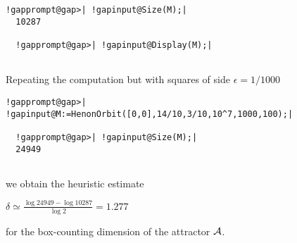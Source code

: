 \documentclass[a4paper,11pt]{report}
\begin{document}
{{\begin{Verbatim}[commandchars=!@|,fontsize=\small,frame=single,label=Example]
  !gapprompt@gap>| !gapinput@Size(M);|
  10287
  
  !gapprompt@gap>| !gapinput@Display(M);|
  
\end{Verbatim}
  

Repeating the computation but with squares of side $\epsilon =1/1000$ 
\begin{Verbatim}[commandchars=!@|,fontsize=\small,frame=single,label=Example]
  !gapprompt@gap>| !gapinput@M:=HenonOrbit([0,0],14/10,3/10,10^7,1000,100);|
  
  !gapprompt@gap>| !gapinput@Size(M);|
  24949
  
\end{Verbatim}
 

 we obtain the heuristic estimate 

$\delta \simeq \frac{ \log{ 24949}- \log{ 10287}} {\log{2}} = 1.277 $ 

 for the box-counting dimension of the attractor $\cal A$. }

 }

 
\end{document}
